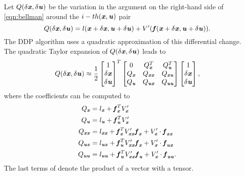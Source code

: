 Let $Q(\dx,\du)$ be the variation in the argument on the right-hand side of \cref{eqn:bellman} around the $i-th (\bx,\bu)$ pair
\begin{equation}\label{eqn:Q}
Q(\dx,\du)=l(\bx+\dx,\bu+\du)+V'(\bfun(\bx+\dx,\bu+\du)).
\end{equation}
The \gls{DDP} algorithm uses a quadratic approximation of this differential change. The quadratic Taylor expansion of $Q(\dx,\du)$ leads to
\begin{equation}\label{eqn:QApprox}
Q(\dx,\du) \approx \dfrac{1}{2} 
\begin{bmatrix} 1 \\ \dx \\ \du \end{bmatrix}^T 
\begin{bmatrix} 0 & Q_{\bx}^T & Q_{\bu}^T \\
Q_{\bx} & Q_{\bx\bx} & Q_{\bx\bu} \\
Q_{\bu} & Q_{\bu\bx} & Q_{\bu\bu} \end{bmatrix}
\begin{bmatrix} 1 \\ \dx \\ \du \end{bmatrix},
\end{equation}
where the coefficients can be computed to 
\begin{subequations}\label{eqn:QApproxCoeff}
\begin{align}
Q_{\bx} &= l_{\bx}+\bfun_{\bx}^T V_{\bx}^\prime \\
Q_{\bu} &= l_{\bu}+\bfun_{\bu}^T V_{\bx}^\prime \\
Q_{\bx\bx} &= l_{\bx\bx}+\bfun_{\bx}^T V_{\bx\bx}^\prime\bfun_{\bx}+V_{\bx}^\prime\cdot\bfun_{\bx\bx}  \label{subeqn:Qxx}\\
Q_{\bu\bx} &= l_{\bu\bx}+\bfun_{\bu}^T V_{\bx\bx}^\prime\bfun_{\bx}+V_{\bx}^\prime\cdot\bfun_{\bu\bx} \label{subeqn:Qux}\\
Q_{\bu\bu} &= l_{\bu\bu}+\bfun_{\bu}^T V_{\bx\bx}^\prime\bfun_{\bu}+V_{\bx}^\prime\cdot\bfun_{\bu\bu} \label{subeqn:Quu}.
\end{align}
\end{subequations}
The last terms of  denote the product of a vector with a tensor. 


